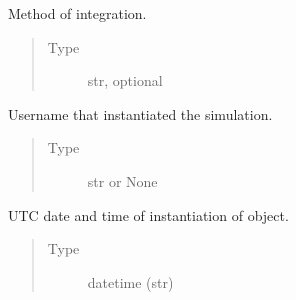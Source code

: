 \documentclass[a4paper,landscape,10pt,english]{sphinxmanual}
\begin{document}
\begin{fulllineitems}
\begin{fulllineitems}
\begin{quote}
\begin{description}
\end{description}\end{quote}

\end{fulllineitems}


\begin{fulllineitems}
\label{\detokenize{code_docs/simulation_api.simulation:simulation_api.simulation.simulations.Simulation.method}}
Method of integration.
\begin{quote}\begin{description}
\item[{Type}] \leavevmode
str, optional

\end{description}\end{quote}

\end{fulllineitems}


\begin{fulllineitems}
\label{\detokenize{code_docs/simulation_api.simulation:simulation_api.simulation.simulations.Simulation.user_name}}
Username that instantiated the simulation.
\begin{quote}\begin{description}
\item[{Type}] \leavevmode
str or None

\end{description}\end{quote}

\end{fulllineitems}


\begin{fulllineitems}
\label{\detokenize{code_docs/simulation_api.simulation:simulation_api.simulation.simulations.Simulation.date}}
UTC date and time of instantiation of object.
\begin{quote}\begin{description}
\item[{Type}] \leavevmode
datetime (str)


\end{description}
\end{quote}
\end{fulllineitems}
\end{fulllineitems}
\end{document}
